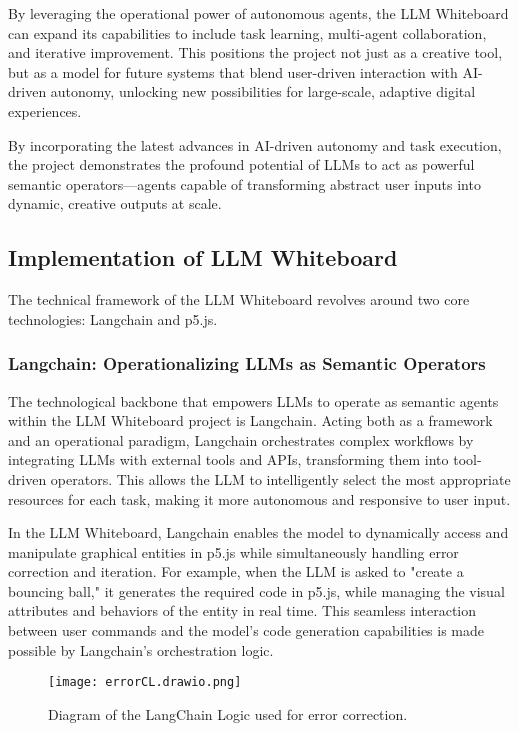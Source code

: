 By leveraging the operational power of autonomous agents, the LLM Whiteboard can expand its capabilities to include task learning, multi-agent collaboration, and iterative improvement.
This positions the project not just as a creative tool, but as a model for future systems that blend user-driven interaction with AI-driven autonomy, unlocking new possibilities for large-scale, adaptive digital experiences.

By incorporating the latest advances in AI-driven autonomy and task execution, the project demonstrates the profound potential of LLMs to act as powerful semantic operators—agents capable of transforming abstract user inputs into dynamic, creative outputs at scale.

\subsection{ Implementation of LLM Whiteboard}

The technical framework of the LLM Whiteboard revolves around two core technologies: Langchain and p5.js.

\subsubsection{Langchain: Operationalizing LLMs as Semantic Operators}

The technological backbone that empowers LLMs to operate as semantic agents within the LLM Whiteboard project is Langchain.
Acting both as a framework and an operational paradigm, Langchain orchestrates complex workflows by integrating LLMs with external tools and APIs, transforming them into tool-driven operators.
This allows the LLM to intelligently select the most appropriate resources for each task, making it more autonomous and responsive to user input.

In the LLM Whiteboard, Langchain enables the model to dynamically access and manipulate graphical entities in p5.js while simultaneously handling error correction and iteration.
For example, when the LLM is asked to "create a bouncing ball," it generates the required code in p5.js, while managing the visual attributes and behaviors of the entity in real time.
This seamless interaction between user commands and the model's code generation capabilities is made possible by Langchain's orchestration logic.

\begin{figure}[h!]
    \centering
    \texttt{[image: errorCL.drawio.png]}
    \caption{Diagram of the LangChain Logic used for error correction.}
    \vspace{0.1cm}
    \label{fig:langchainlogic}
\end{figure}

